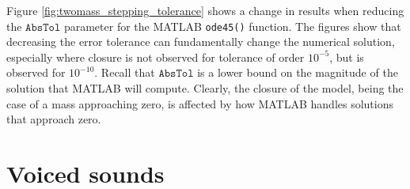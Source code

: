 Figure \ref{fig:twomass_stepping_tolerance} shows a change in results when reducing the $\mathtt{AbsTol}$ parameter for the MATLAB \texttt{ode45()} function.
The figures show that decreasing the error tolerance can fundamentally change the numerical solution,
especially where closure is not observed for tolerance of order $10^{-5}$,
but is observed for $10^{-10}$.
Recall that $\mathtt{AbsTol}$ is a lower bound on the magnitude of the solution that MATLAB will compute.
Clearly, the closure of the model, being the case of a mass approaching zero,
is affected by how MATLAB handles solutions that approach zero.

\section{Voiced sounds}

